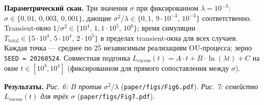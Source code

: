 \documentclass[pdflatex,sn-mathphys-ay]{sn-jnl}
\begin{document}
\textbf{Параметрический скан.} Три значения \(\sigma\) при фиксированном \(\lambda = 10^{-3}\): \(\sigma \in \{0{,}01,\, 0{,}003,\, 0{,}001\}\), дающие \(\sigma^2/\lambda \in \{0{,}1,\, 9 \cdot 10^{-3},\, 10^{-3}\}\) соответственно. Transient-окно \(1/\sigma^2 \in \{10^4,\, 1{,}1\cdot 10^5,\, 10^6\}\); время симуляции \(T_{\text{total}} \in \{5\cdot 10^4,\, 5\cdot 10^4,\, 2\cdot 10^5\}\) в пределах transient-окна для всех случаев. Каждая точка --- среднее по 25 независимым реализациям OU-процесса; зерно \texttt{SEED\ =\ 20260524}. Совместная подгонка \(L_{\text{excess}}(t) = A \cdot t + B \cdot \ln(\lambda t) + C\) на окне \(t \in [10^3, 10^4]\) (фиксированном для прямого сопоставления между \(\sigma\)).



\textbf{Результаты.} \emph{Рис. 6: \(B\) против \(\sigma^2/\lambda\)} (\texttt{paper/figs/Fig6.pdf}). \emph{Рис. 7: семейство \(L_{\text{excess}}(t)\) для трёх \(\sigma\)} (\texttt{paper/figs/Fig7.pdf}).
\end{document}
